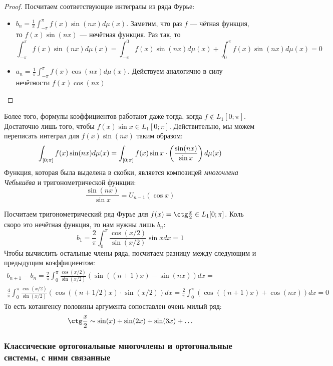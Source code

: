 \begin{proof}
	Посчитаем соответствующие интегралы из ряда Фурье:
	\begin{itemize}
		\item $b_n = \frac{1}{\pi}\int_{-\pi}^\pi f(x)\sin(nx)d\mu(x)$. Заметим, что раз $f$ --- чётная функция, то $f(x)\sin(nx)$ --- нечётная функция. Раз так, то
		\[
			\int_{-\pi}^\pi f(x)\sin(nx)d\mu(x) = \int_{-\pi}^0 f(x)\sin(nx)d\mu(x) + \int_0^\pi f(x)\sin(nx)d\mu(x) = 0
		\]
		
		\item $a_n = \frac{1}{\pi}\int_{-\pi}^\pi f(x)\cos(nx)d\mu(x)$. Действуем аналогично в силу нечётности $f(x)\cos(nx)$
	\end{itemize}
\end{proof}

\begin{note}
	Более того, формулы коэффициентов работают даже тогда, когда $f \notin L_1[0; \pi]$. Достаточно лишь того, чтобы $f(x)\sin x \in L_1[0; \pi]$. Действительно, мы можем переписать интеграл для $f(x)\sin(nx)$ таким образом:
	\[
		\int_{[0; \pi]} f(x)\sin(nx)d\mu(x) = \int_{[0; \pi]} f(x)\sin x \cdot \left(\frac{\sin(nx)}{\sin x}\right)d\mu(x)
	\]
	Функция, которая была выделена в скобки, является композицей \textit{многочлена Чебышёва} и тригонометрической функции:
	\[
		\frac{\sin(nx)}{\sin x} = U_{n - 1}(\cos x)
	\]
\end{note}

\begin{example}
	Посчитаем тригонометрический ряд Фурье для $f(x) = \ctg \frac{x}{2} \in L_1[0; \pi]$. Коль скоро это нечётная функция, то нам нужны лишь $b_n$:
	\[
		b_1 = \frac{2}{\pi} \int_0^\pi \frac{\cos(x / 2)}{\sin(x / 2)} \sin xdx = 1
	\]
	Чтобы вычислить остальные члены ряда, посчитаем разницу между следующим и предыдущим коэффициентом:
	\begin{multline*}
		b_{n + 1} - b_n = \frac{2}{\pi} \int_0^\pi \frac{\cos(x / 2)}{\sin(x / 2)}(\sin((n + 1)x) - \sin(nx))dx =
		\\
		\frac{4}{\pi}\int_0^\pi \frac{\cos(x / 2)}{\sin(x / 2)}(\cos((n + 1/2)x) \cdot \sin(x / 2))dx = \frac{2}{\pi}\int_0^\pi (\cos((n + 1)x) + \cos(nx))dx = 0
	\end{multline*}
	То есть котангенсу половины аргумента сопоставлен очень милый ряд:
	\[
		\ctg \frac{x}{2} \sim \sin(x) + \sin(2x) + \sin(3x) + \ldots
	\]
\end{example}

\subsubsection*{Классические ортогональные многочлены и ортогональные системы, с ними связанные}


